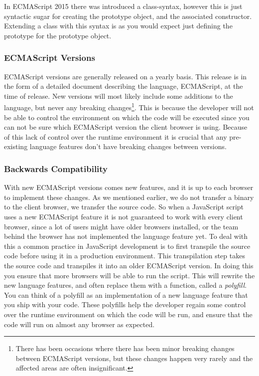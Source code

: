 In ECMAScript 2015 there was introduced a class-syntax, however this is just syntactic sugar for creating the prototype object, and the associated constructor.
Extending a class with this syntax is as you would expect just defining the prototype for the prototype object.

\subsubsection{ECMAScript Versions}\label{subsubsec:ecmascript-versions}

ECMAScript versions are generally released on a yearly basis.
This release is in the form of a detailed document describing the language, ECMAScript, at the time of release.
New versions will most likely include some additions to the language, but never any breaking changes\footnote{There has been occasions where there has been minor breaking changes between ECMAScript versions, but these changes happen very rarely and the affected areas are often insignificant.}.
This is because the developer will not be able to control the environment on which the code will be executed since you can not be sure which ECMAScript version the client browser is using.
Because of this lack of control over the runtime environment it is crucial that any pre-existing language features don't have breaking changes between versions.

\subsubsection{Backwards Compatibility}\label{subsubsec:backwards-compatability}

With new ECMAScript versions comes new features, and it is up to each browser to implement these changes.
As we mentioned earlier, we do not transfer a binary to the client browser, we transfer the source code.
So when a JavaScript script uses a new ECMAScript feature it is not guaranteed to work with every client browser, since a lot of users might have older browsers installed, or the team behind the browser has not implemented the language feature yet.
To deal with this a common practice in JavaScript development is to first transpile the source code before using it in a production environment.
This transpilation step takes the source code and transpiles it into an older ECMAScript version.
In doing this you ensure that more browsers will be able to run the script.
This will rewrite the new language features, and often replace them with a function, called a \textit{polyfill}.
You can think of a polyfill as an implementation of a new language feature that you ship with your code.
These polyfills help the developer regain some control over the runtime environment on which the code will be run, and ensure that the code will run on almost any browser as expected.

